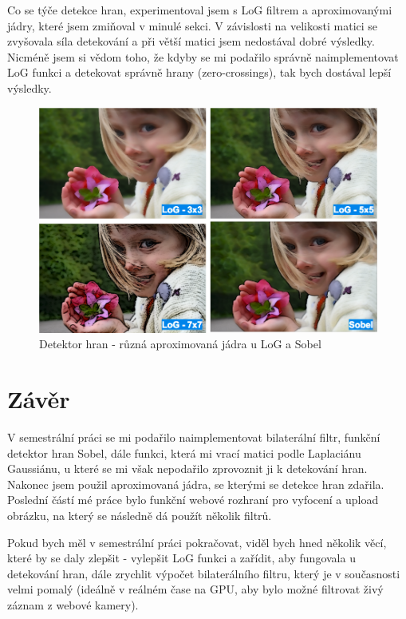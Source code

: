 \documentclass[11pt,oneside]{article}
\begin{document}
Co se týče detekce hran, experimentoval jsem s LoG filtrem a aproximovanými jádry, které jsem zmiňoval v minulé sekci. V závislosti na velikosti matici se zvyšovala síla detekování a při větší matici jsem nedostával dobré výsledky. Nicméně jsem si vědom toho, že kdyby se mi podařilo správně naimplementovat LoG funkci a detekovat správně hrany (zero-crossings), tak bych dostával lepší výsledky.

\begin{figure}[!htb]
\centering
\includegraphics[width=1.0\textwidth]{edge-02.png}
\caption{Detektor hran - různá aproximovaná jádra u LoG a Sobel}
\end{figure}

\clearpage

\section{Závěr}
\par{V semestrální práci se mi podařilo naimplementovat bilaterální filtr, funkční detektor hran Sobel, dále funkci, která mi vrací matici podle Laplaciánu Gaussiánu, u které se mi však nepodařilo zprovoznit ji k detekování hran. Nakonec jsem použil aproximovaná jádra, se kterými se detekce hran zdařila. Poslední částí mé práce bylo funkční webové rozhraní pro vyfocení a upload obrázku, na který se následně dá použít několik filtrů.}

\par{Pokud bych měl v semestrální práci pokračovat, viděl bych hned několik věcí, které by se daly zlepšit - vylepšit LoG funkci a zařídit, aby fungovala u detekování hran, dále zrychlit výpočet bilaterálního filtru, který je v současnosti velmi pomalý (ideálně v reálném čase na GPU, aby bylo možné filtrovat živý záznam z webové kamery).}
\end{document}
